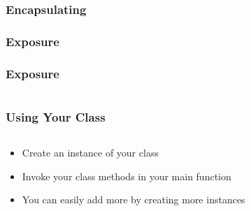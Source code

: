 \begin{frame}[fragile]
	\frametitle{Encapsulating}
	
\end{frame}

\begin{frame}
	\frametitle{Exposure}
\end{frame}

\begin{frame}[fragile]
	\frametitle{Exposure}
	\begin{columns}[T]
		\begin{column}{0.5\textwidth}
			
		\end{column}
		\begin{column}{0.5\textwidth}
			
		\end{column}
	\end{columns}
\end{frame}

\begin{frame}
	\frametitle{Using Your Class}
	\begin{columns}[T]
		\begin{column}{0.5\textwidth}
			\begin{itemize}
				\item Create an instance of your class
				\item Invoke your class methods in your main function
				\item You can easily add more by creating more instances
			\end{itemize}
		\end{column}
		\begin{column}{0.5\textwidth}
					
		\end{column}
	\end{columns}
\end{frame}